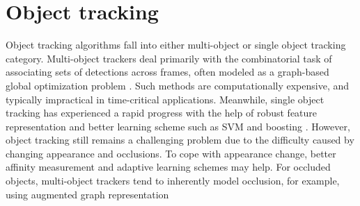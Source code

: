 \section{Object tracking}
Object tracking algorithms fall into either multi-object or single object tracking category. Multi-object trackers deal primarily with the combinatorial task of associating sets of detections across frames, often modeled as a graph-based global optimization problem 
\cite{butt2013multi,berclaz2011multiple}.
Such methods are computationally expensive, and typically impractical in time-critical applications. Meanwhile, single object tracking has experienced a rapid progress with the help of robust feature representation \cite{kwon2010visual} %
and better learning scheme such as SVM \cite{hare2011struck} and boosting \cite{grabner2006real}. 
However, object tracking still remains a challenging problem due to the difficulty caused by changing appearance and occlusions. To cope with appearance change, better affinity measurement \cite{choi2015near} and adaptive learning schemes \cite{kalal2012tracking} may help.
For occluded objects, multi-object trackers tend to inherently model occlusion, for example, using augmented graph representation \cite{butt2013multi} %

